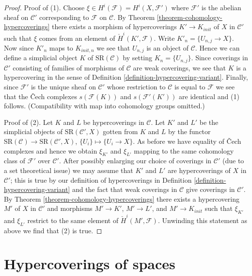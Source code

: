 \documentclass{stacks-project}
\theoremstyle{plain}
\theoremstyle{definition}
\theoremstyle{remark}
\numberwithin{equation}{subsection}
\begin{document}
\begin{proof}
\medskip\noindent
Proof of (1). Choose $\xi \in H^i(\mathcal{F}) = H^i(X, \mathcal{F}')$
where $\mathcal{F}'$ is the abelian sheaf on $\mathcal{C}'$ corresponding
to $\mathcal{F}$ on $\mathcal{C}$. By
Theorem \ref{theorem-cohomology-hypercoverings}
there exists a morphism of hypercoverings $K' \to K_{init}$
of $X$ in $\mathcal{C}'$ such that $\xi$ comes from an element
of $\check{H}^i(K', \mathcal{F})$.
Write $K'_n = \{U_{n, j} \to X\}$. Now since $K'_n$ maps to
$K_{init, n}$ we see that $U_{n, j}$ is an object of $\mathcal{C}$.
Hence we can define a simplicial object $K$ of $\text{SR}(\mathcal{C})$
by setting $K_n = \{U_{n, j}\}$. Since coverings in
$\mathcal{C}'$ consisting of families of morphisms of $\mathcal{C}$
are weak coverings, we see that $K$ is a hypercovering in the sense
of Definition \ref{definition-hypercovering-variant}.
Finally, since $\mathcal{F}'$ is the unique sheaf on $\mathcal{C}'$
whose restriction to $\mathcal{C}$ is equal to $\mathcal{F}$
we see that the {\v C}ech complexes $s(\mathcal{F}(K))$
and $s(\mathcal{F}'(K'))$ are identical and (1) follows.
(Compatibility with map into cohomology groups omitted.)

\medskip\noindent
Proof of (2). Let $K$ and $L$ be hypercoverings in $\mathcal{C}$.
Let $K'$ and $L'$ be the simplicial objects of $\text{SR}(\mathcal{C}', X)$
gotten from $K$ and $L$ by the functor
$\text{SR}(\mathcal{C}) \to \text{SR}(\mathcal{C}', X)$,
$\{U_i\} \mapsto \{U_i \to X\}$. As before we have equality of
{\v C}ech complexes and hence we obtain $\xi_{K'}$ and
$\xi_{L'}$ mapping to the same cohomology class of $\mathcal{F}'$
over $\mathcal{C}'$. After possibly enlarging our choice
of coverings in $\mathcal{C}'$ (due to a set theoretical issue)
we may assume that $K'$ and $L'$ are hypercoverings of $X$ in
$\mathcal{C}'$; this is true by our definition of hypercoverings in
Definition \ref{definition-hypercovering-variant} and
the fact that weak coverings in $\mathcal{C}$ give coverings in
$\mathcal{C}'$. By
Theorem \ref{theorem-cohomology-hypercoverings}
there exists a hypercovering $M'$ of $X$ in $\mathcal{C}'$
and morphisms $M' \to K'$, $M' \to L'$, and $M' \to K_{init}$
such that $\xi_{K'}$ and $\xi_{L'}$ restrict to the same element of
$\check{H}^i(M', \mathcal{F})$. Unwinding this statement as above
we find that (2) is true.
\end{proof}





\section{Hypercoverings of spaces}
\label{section-hypercoverings-spaces}
\end{document}

